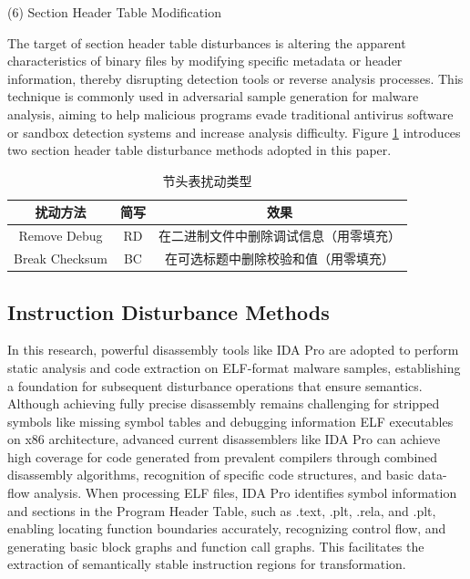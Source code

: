 (6) Section Header Table Modification

The target of section header table disturbances is altering the apparent characteristics of binary files by modifying specific metadata or header information, thereby disrupting detection tools or reverse analysis processes. This technique is commonly used in adversarial sample generation for malware analysis, aiming to help malicious programs evade traditional antivirus software or sandbox detection systems and increase analysis difficulty. Figure \ref{tab:4.5} introduces two section header table disturbance methods adopted in this paper.

\begin{table}[htbp]
	\centering
	\caption{节头表扰动类型}\label{tab:4.5}
	\begin{tabular*}{0.9\textwidth}{@{\extracolsep{\fill}}ccc}
		\toprule
		扰动方法 & 简写 & 效果 \\
		\midrule
		Remove Debug & RD & 在二进制文件中删除调试信息（用零填充） \\
		Break Checksum & BC & 在可选标题中删除校验和值（用零填充） \\
		\bottomrule
	\end{tabular*}
\end{table}



\subsection{Instruction Disturbance Methods}

In this research, powerful disassembly tools like IDA Pro are adopted to perform static analysis and code extraction on ELF-format malware samples, establishing a foundation for subsequent disturbance operations that ensure semantics. Although achieving fully precise disassembly remains challenging for stripped symbols like missing symbol tables and debugging information ELF executables on x86 architecture, advanced current disassemblers like IDA Pro can achieve high coverage for code generated from prevalent compilers through combined disassembly algorithms, recognition of specific code structures, and basic data-flow analysis. When processing ELF files, IDA Pro identifies symbol information and sections in the Program Header Table, such as .text, .plt, .rela, and .plt, enabling locating function boundaries accurately, recognizing control flow, and generating basic block graphs and function call graphs. This facilitates the extraction of semantically stable instruction regions for transformation.


